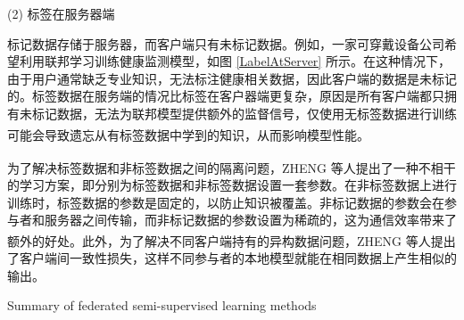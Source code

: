 (2) 标签在服务器端

标记数据存储于服务器，而客户端只有未标记数据。例如，一家可穿戴设备公司希望利用联邦学习训练健康监测模型，如图 \ref{LabelAtServer} 所示。在这种情况下，由于用户通常缺乏专业知识，无法标注健康相关数据，因此客户端的数据是未标记的。标签数据在服务端的情况比标签在客户器端更复杂，原因是所有客户端都只拥有未标记数据，无法为联邦模型提供额外的监督信号，仅使用无标签数据进行训练可能会导致遗忘从有标签数据中学到的知识，从而影响模型性能\textsuperscript{\cite{jeong2020federated,diao2022semifl}}。


为了解决标签数据和非标签数据之间的隔离问题，ZHENG 等人\textsuperscript{\cite{jeong2020federated}}提出了一种不相干的学习方案，即分别为标签数据和非标签数据设置一套参数。在非标签数据上进行训练时，标签数据的参数是固定的，以防止知识被覆盖。非标记数据的参数会在参与者和服务器之间传输，而非标记数据的参数设置为稀疏的，这为通信效率带来了额外的好处。此外，为了解决不同客户端持有的异构数据问题，ZHENG 等人\textsuperscript{\cite{jeong2020federated}}提出了客户端间一致性损失，这样不同参与者的本地模型就能在相同数据上产生相似的输出。

\vspace{-0.1cm}
\begin{table}[h]
	\centering
	{\songti \wuhao Summary of federated semi-supervised learning methods}
	\label{SummaryOfFedSemi}
\end{table}
\vspace{-0.35cm}

